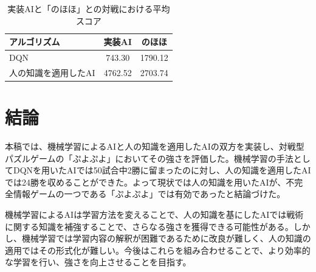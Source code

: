 \documentclass[twocolumn, a4paper]{UECIEresume}
\begin{document}
\begin{table}[tbp]
\begin{center}
\caption{実装AIと「のほほ」との対戦における平均スコア} \label{tab:score}
  \begin{tabular}{|l|c|c|} \hline
アルゴリズム & 実装AI & のほほ\\ \hline
DQN & 743.30 & 1790.12\\ \hline
人の知識を適用したAI & 4762.52 & 2703.74\\ \hline
\end{tabular}
\end{center}
\end{table}


\section{結論}
本稿では、機械学習によるAIと人の知識を適用したAIの双方を実装し、対戦型パズルゲームの「ぷよぷよ」においてその強さを評価した。機械学習の手法としてDQNを用いたAIでは50試合中2勝に留まったのに対し、人の知識を適用したAIでは24勝を収めることができた。よって現状では人の知識を用いたAIが、不完全情報ゲームの一つである「ぷよぷよ」では有効であったと結論づけた。

機械学習によるAIは学習方法を変えることで、人の知識を基にしたAIでは戦術に関する知識を補強することで、さらなる強さを獲得できる可能性がある。しかし、機械学習では学習内容の解釈が困難であるために改良が難しく、人の知識の適用ではその形式化が難しい。今後はこれらを組み合わせることで、より効率的な学習を行い、強さを向上させることを目指す。

{\small


}
\end{document}
